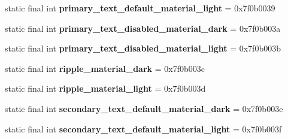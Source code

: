 \begin{DoxyCompactItemize}
\item 
\hypertarget{classandroid_1_1support_1_1v7_1_1appcompat_1_1_r_1_1color_ab36d1e90360d5a93724ea06e0fb4eaea}{}static final int {\bfseries primary\+\_\+text\+\_\+default\+\_\+material\+\_\+light} = 0x7f0b0039\label{classandroid_1_1support_1_1v7_1_1appcompat_1_1_r_1_1color_ab36d1e90360d5a93724ea06e0fb4eaea}

\item 
\hypertarget{classandroid_1_1support_1_1v7_1_1appcompat_1_1_r_1_1color_a71e048d87b5feafa695cf01a565a4e3e}{}static final int {\bfseries primary\+\_\+text\+\_\+disabled\+\_\+material\+\_\+dark} = 0x7f0b003a\label{classandroid_1_1support_1_1v7_1_1appcompat_1_1_r_1_1color_a71e048d87b5feafa695cf01a565a4e3e}

\item 
\hypertarget{classandroid_1_1support_1_1v7_1_1appcompat_1_1_r_1_1color_acbf6e5e5cb1d31d8e8532e7b1402ca96}{}static final int {\bfseries primary\+\_\+text\+\_\+disabled\+\_\+material\+\_\+light} = 0x7f0b003b\label{classandroid_1_1support_1_1v7_1_1appcompat_1_1_r_1_1color_acbf6e5e5cb1d31d8e8532e7b1402ca96}

\item 
\hypertarget{classandroid_1_1support_1_1v7_1_1appcompat_1_1_r_1_1color_a8a6b3082ea6856989bc2959dfe9276c5}{}static final int {\bfseries ripple\+\_\+material\+\_\+dark} = 0x7f0b003c\label{classandroid_1_1support_1_1v7_1_1appcompat_1_1_r_1_1color_a8a6b3082ea6856989bc2959dfe9276c5}

\item 
\hypertarget{classandroid_1_1support_1_1v7_1_1appcompat_1_1_r_1_1color_a15949cbaffddc41a139e2075c8bb3f14}{}static final int {\bfseries ripple\+\_\+material\+\_\+light} = 0x7f0b003d\label{classandroid_1_1support_1_1v7_1_1appcompat_1_1_r_1_1color_a15949cbaffddc41a139e2075c8bb3f14}

\item 
\hypertarget{classandroid_1_1support_1_1v7_1_1appcompat_1_1_r_1_1color_a37d7fa18b0ff48fbaf8ee035afc43a2c}{}static final int {\bfseries secondary\+\_\+text\+\_\+default\+\_\+material\+\_\+dark} = 0x7f0b003e\label{classandroid_1_1support_1_1v7_1_1appcompat_1_1_r_1_1color_a37d7fa18b0ff48fbaf8ee035afc43a2c}

\item 
\hypertarget{classandroid_1_1support_1_1v7_1_1appcompat_1_1_r_1_1color_a2f57c3847bf68150f0fd7f8c93799ad6}{}static final int {\bfseries secondary\+\_\+text\+\_\+default\+\_\+material\+\_\+light} = 0x7f0b003f\label{classandroid_1_1support_1_1v7_1_1appcompat_1_1_r_1_1color_a2f57c3847bf68150f0fd7f8c93799ad6}


\end{DoxyCompactItemize}
